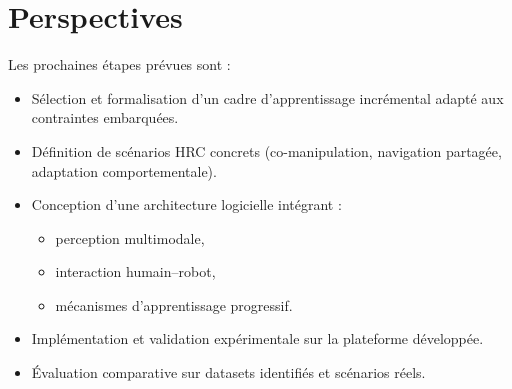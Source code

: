 \section{Perspectives}

Les prochaines étapes prévues sont :
\begin{itemize}
    \item Sélection et formalisation d’un cadre d’apprentissage incrémental adapté aux contraintes embarquées.
    \item Définition de scénarios HRC concrets (co-manipulation, navigation partagée, adaptation comportementale).
    \item Conception d’une architecture logicielle intégrant :
    \begin{itemize}
        \item perception multimodale,
        \item interaction humain–robot,
        \item mécanismes d’apprentissage progressif.
    \end{itemize}
    \item Implémentation et validation expérimentale sur la plateforme développée.
    \item Évaluation comparative sur datasets identifiés et scénarios réels.
\end{itemize}
